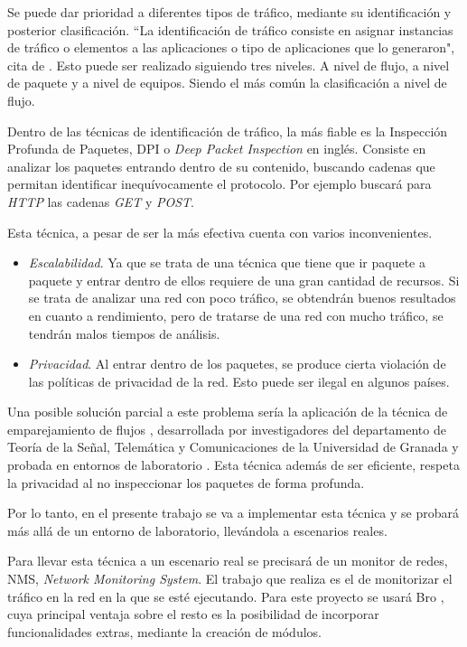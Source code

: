 \intro Se puede dar prioridad a diferentes tipos de tráfico, mediante su identificación y posterior clasificación. ``La identificación
de tráfico consiste en asignar instancias de tráfico o elementos a las aplicaciones o tipo de aplicaciones que lo generaron", cita de 
\cite{khalife2016}. Esto puede ser realizado siguiendo tres niveles. A nivel de flujo, a nivel de paquete y a nivel de equipos. Siendo 
el más común la clasificación a nivel de flujo.

\intro Dentro de las técnicas de identificación de tráfico, la más fiable es la Inspección Profunda de Paquetes, DPI o \textit{Deep 
Packet Inspection} en inglés\cite{dpiaproximacion}. Consiste en analizar los paquetes entrando dentro de su contenido, buscando 
cadenas que permitan identificar inequívocamente el protocolo. Por ejemplo buscará para \textit{HTTP} las cadenas \textit{GET} y 
\textit{POST}.

\intro Esta técnica, a pesar de ser la más efectiva cuenta con varios inconvenientes.
\begin{itemize}
\item \textit{Escalabilidad}. Ya que se trata de una técnica que tiene que ir paquete a paquete y entrar dentro de ellos requiere de 
una gran cantidad de recursos. Si se trata de analizar una red con poco tráfico, se obtendrán buenos resultados en cuanto a 
rendimiento, pero de tratarse de una red con mucho tráfico, se tendrán malos tiempos de análisis.
\item \textit{Privacidad}. Al entrar dentro de los paquetes, se produce cierta violación de las políticas de privacidad de la red. Esto puede ser ilegal en algunos países.
\end{itemize}

\intro Una posible solución parcial a este problema sería la aplicación de la técnica de emparejamiento de flujos \cite{presentacion}, 
desarrollada por investigadores del departamento de Teoría de la Señal, Telemática y Comunicaciones de la Universidad de Granada y  
probada en entornos de laboratorio \cite{comparacion}. Esta técnica además de ser eficiente, respeta la privacidad al no inspeccionar 
los paquetes de forma profunda.

\intro Por lo tanto, en el presente trabajo se va a implementar esta técnica y se probará más allá de un entorno de laboratorio, 
llevándola a escenarios reales.

\intro Para llevar esta técnica a un escenario real se precisará de un monitor de redes, NMS, \textit{Network Monitoring System}. 
El trabajo que realiza es el de monitorizar el tráfico en la red en la que se esté ejecutando.
Para este proyecto se usará Bro \cite{broindex}, cuya principal ventaja sobre el resto es la posibilidad de incorporar funcionalidades 
extras, mediante la creación de módulos.

